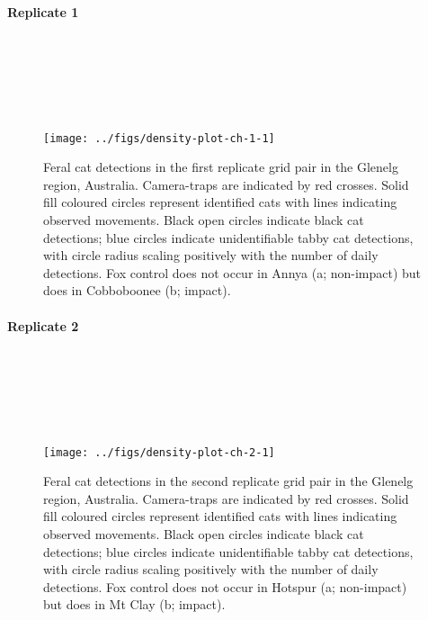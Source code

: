 \documentclass[preprint, 3p, authoryear]{elsarticle} %
\begin{document}
\hypertarget{replicate-1}{%
\paragraph{Replicate 1}\label{replicate-1}}

\(~\)

\(~\)

\(~\)

\begin{figure}

{\centering \texttt{[image: ../figs/density-plot-ch-1-1]} 

}

\caption{Feral cat detections in the first replicate grid pair in the Glenelg region, Australia. Camera-traps are indicated by red crosses. Solid fill coloured circles represent identified cats with lines indicating observed movements. Black open circles indicate black cat detections; blue circles indicate unidentifiable tabby cat detections, with circle radius scaling positively with the number of daily detections. Fox control does not occur in Annya (a; non-impact) but does in Cobboboonee (b; impact).}\label{fig:density-plot-ch-1}
\end{figure}

\newpage

\hypertarget{replicate-2}{%
\paragraph{Replicate 2}\label{replicate-2}}

\(~\)

\(~\)

\(~\)

\begin{figure}

{\centering \texttt{[image: ../figs/density-plot-ch-2-1]} 

}

\caption{Feral cat detections in the second replicate grid pair in the Glenelg region, Australia. Camera-traps are indicated by red crosses. Solid fill coloured circles represent identified cats with lines indicating observed movements. Black open circles indicate black cat detections; blue circles indicate unidentifiable tabby cat detections, with circle radius scaling positively with the number of daily detections. Fox control does not occur in Hotspur (a; non-impact) but does in Mt Clay (b; impact).}\label{fig:density-plot-ch-2}
\end{figure}
\end{document}
